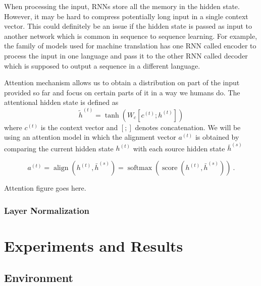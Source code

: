 \documentclass[titlepage]{report}
\DeclareMathOperator{\softmax}{softmax}
\DeclareMathOperator{\score}{score}
\DeclareMathOperator{\aln}{align}
\begin{document}
When processing the input, RNNs store all the memory in the hidden state. However, it may be hard to compress potentially long input in a single context vector.
This could definitely be an issue if the hidden state is passed as input to another network which is common in sequence to sequence learning. For example, the family of models used for machine translation has one RNN called encoder to process the input in one language and pass it to the other RNN called decoder which is supposed to output a sequence in a different language.

Attention mechanism allows us to obtain a distribution on part of the input provided so far and focus on certain parts of it in a way we humans do. The attentional hidden state is defined as
\begin{equation*}
\widetilde{h}^{(t)} = \tanh(W_c [c^{(t)}; h^{(t)}])
\end{equation*}
where $c^{(t)}$ is the context vector and $[ ; ]$ denotes concatenation. We will be using an attention model in which the alignment vector $a^{(t)}$ is obtained by comparing the current hidden state $h^{(t)}$ with each source hidden state $\bar{h}^{(s)}$

\begin{equation*}
a^{(t)} = \aln (h^{(t)}, \bar{h}^{(s)}) = \softmax(\score(h^{(t)}, \bar{h}^{(s)})) \:.
\end{equation*}

\begin{center}
Attention figure goes here.
\end{center}

\subsection{Layer Normalization}

\chapter{Experiments and Results}

\section{Environment}
\end{document}
